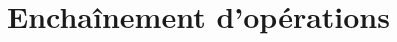 \themaN
\graphicspath{{../../S01_Enchainement_operations/Images/}}

\chapter{Enchaînement d'opérations}
\label{S01}




%
%
%
%
